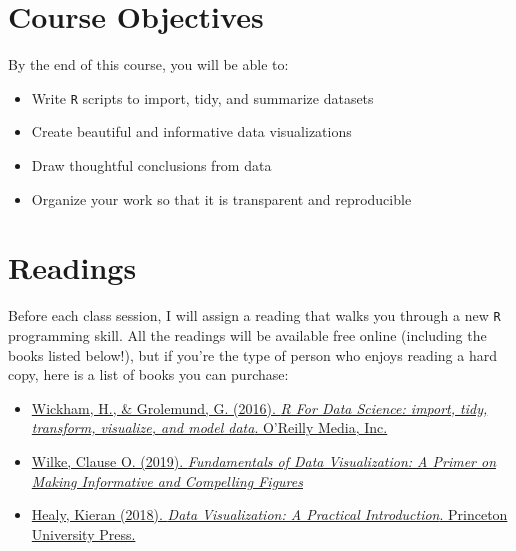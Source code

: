 \documentclass[11pt, letterpaper]{article}
\begin{document}

\section*{Course Objectives}
By the end of this course, you will be able to:
\begin{itemize}
	\item Write \texttt{R} scripts to import, tidy, and summarize datasets
	\item Create beautiful and informative data visualizations 
	\item Draw thoughtful conclusions from data
	\item Organize your work so that it is transparent and reproducible
\end{itemize}

\section*{Readings}
Before each class session, I will assign a reading that walks you through a new \texttt{R} programming skill. All the readings will be available free online (including the books listed below!), but if you're the type of person who enjoys reading a hard copy, here is a list of books you can purchase:

\begin{itemize}
	\item \href{https://r4ds.had.co.nz/}{Wickham, H., \& Grolemund, G. (2016). \textit{R For Data Science: import, tidy, transform, visualize, and model data}. O'Reilly Media, Inc.}

	\item \href{https://clauswilke.com/dataviz/}{Wilke, Clause O. (2019). \textit{Fundamentals of Data Visualization: A Primer on Making Informative and Compelling Figures}}
	
	\item \href{https://socviz.co/}{Healy, Kieran (2018). \textit{Data Visualization: A Practical Introduction}. Princeton University Press.} 
	
	
\end{itemize} 
\end{document}
